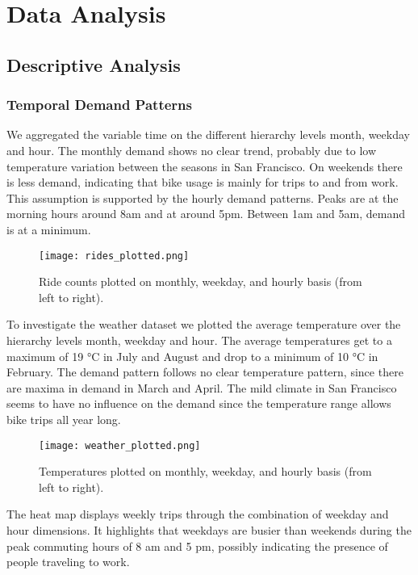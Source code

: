\chapter{Data Analysis}

\section{Descriptive Analysis}
\subsection{Temporal Demand Patterns} 

We aggregated the variable time on the different hierarchy levels month, weekday and hour. The monthly demand shows no clear trend, probably due to low temperature variation between the seasons in San Francisco. On weekends there is less demand, indicating that bike usage is mainly for trips to and from work. This assumption is supported by the hourly demand patterns. Peaks are at the morning hours around 8am and at around 5pm. Between 1am and 5am, demand is at a minimum. 

\begin{figure}[hbtp]
    \texttt{[image: rides\_plotted.png]}
    \caption{Ride counts plotted on monthly, weekday, and hourly basis (from left to right).}
\end{figure}

To investigate the weather dataset we plotted the average temperature over the hierarchy levels month, weekday and hour. The average temperatures get to a maximum of 19 °C in July and August and drop to a minimum of 10 °C in February. The demand pattern follows no clear temperature pattern, since there are maxima in demand in March and April. The mild climate in San Francisco seems to have no influence on the demand since the temperature range allows bike trips all year long.

\begin{figure}[hbtp]
    \texttt{[image: weather\_plotted.png]}
    \caption{Temperatures plotted on monthly, weekday, and hourly basis (from left to right).}
\end{figure}

The heat map displays weekly trips through the combination of weekday and hour dimensions. It highlights that weekdays are busier than weekends during the peak commuting hours of 8 am and 5 pm, possibly indicating the presence of people traveling to work.

